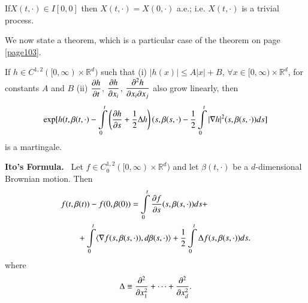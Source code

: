 \begin{remark*}
If\pageoriginale $X(t,\cdot)\in I[0,0]$ then $X(t,\cdot)=X(0,\cdot)$
a.e.; i.e.\@ 
$X(t,\cdot)$ is a trivial process.
\end{remark*}

We now state a theorem, which is a particular case of the theorem on
page \ref{page103}.


\begin{theorem*}
If $h\in C^{1,2}([0,\infty)\times \mathbb{R}^{d})$ such that {\rm(i)}
  $|h(x)|\leq A|x|+B$, $\forall x \in[0,\infty)\times
    \mathbb{R}^{d}$, for constants $A$ and $B$ {\rm(ii)} $\dfrac{\partial
      h}{\partial t}$, $\dfrac{\partial h}{\partial x_{i}}$, $\dfrac{\partial^{2}h}{\partial x_{i}\partial
      x_{j}}$ also grow linearly, then
$$
\exp[h(t,\beta(t,\cdot)-\int\limits^{t}_{0}\left(\frac{\partial h}{\partial
    s}+\frac{1}{2}\Delta
  h\right)(s,\beta(s,\cdot)-\frac{1}{2}\int\limits^{t}_{0}|\nabla h|^{2}(s,\beta(s,\cdot))ds]
$$ 
is a martingale.
\end{theorem*}

\noindent
{\bf Ito's Formula.}~ Let $f\in C^{1,2}_{0}([0,\infty)\times
  \mathbb{R}^{d})$ and let $\beta(t,\cdot)$ be a $d$-dimensio\-nal
  Brownian motion. Then
\begin{align*}
& f(t,\beta(t))-f(0,\beta(0))=\int\limits^{t}_{0}\frac{\partial f}{\partial
  s}(s,\beta(s,\cdot))ds+\\
&\qquad +\int\limits^{t}_{0}\langle \nabla
  f(s,\beta(s,\cdot)),d\beta(s,\cdot)\rangle
  +\frac{1}{2}\int\limits^{t}_{0}\Delta f(s,\beta(s,\cdot))ds.
\end{align*}
where
$$
\Delta\equiv \dfrac{\partial^{2}}{\partial x^{2}_{1}}+\cdots+\frac{\partial^{2}}{\partial
  x^{2}_{d}}.
$$

